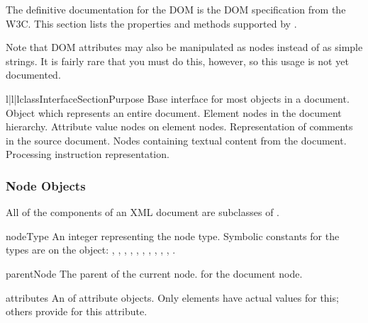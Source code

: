 The definitive documentation for the DOM is the DOM specification from
the W3C.  This section lists the properties and methods supported by
.

Note that DOM attributes may also be manipulated as nodes instead of
as simple strings.  It is fairly rare that you must do this, however,
so this usage is not yet documented.


\begin{tableiii}{l|l|l}{class}{Interface}{Section}{Purpose}
          {Base interface for most objects in a document.}
          {Object which represents an entire document.}
          {Element nodes in the document hierarchy.}
          {Attribute value nodes on element nodes.}
          {Representation of comments in the source document.}
          {Nodes containing textual content from the document.}
          {Processing instruction representation.}
\end{tableiii}


\subsubsection{Node Objects \label{dom-node-objects}}

All of the components of an XML document are subclasses of
.

\begin{memberdesc}[Node]{nodeType}
An integer representing the node type.  Symbolic constants for the
types are on the  object: ,
, ,
, ,
, ,
, ,
, .
\end{memberdesc}

\begin{memberdesc}[Node]{parentNode}
The parent of the current node.   for the document node.
\end{memberdesc}

\begin{memberdesc}[Node]{attributes}
An  of attribute objects.  Only elements have
actual values for this; others provide  for this attribute.
\end{memberdesc}

